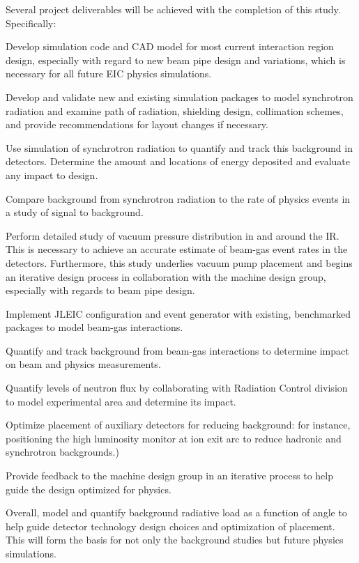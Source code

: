 Several project deliverables will be achieved with the completion of this study.  Specifically:
\begin{itemize}[label=\textbullet]
	
		\litem{} Develop simulation code and CAD model for most current interaction region design, especially with regard to new beam pipe design and variations, which is necessary for all future EIC physics simulations. 
	
		\litem{}Develop and validate new and existing simulation packages to model synchrotron radiation and examine path of radiation, shielding design, collimation schemes, and provide recommendations for layout changes if necessary.
		
		\litem{} Use simulation of synchrotron radiation to quantify and track this background in detectors.  Determine the amount and locations of energy deposited and evaluate any impact to  design.
		
		\litem{} Compare background from synchrotron radiation to the rate of physics events in a study of signal to background. 
		
		\litem{} Perform detailed study of vacuum pressure distribution in and around the IR.  This is necessary to achieve an accurate estimate of beam-gas event rates in the detectors.  Furthermore, this study underlies vacuum pump placement and begins an iterative design process in collaboration with the machine design group, especially with regards to beam pipe design.
		
		\litem{} Implement JLEIC configuration and event generator with existing, benchmarked packages to model beam-gas interactions.
		
		\litem{} Quantify and track background from beam-gas interactions to determine impact on beam and physics measurements.
		
		\litem{} Quantify levels of neutron flux by collaborating with Radiation Control division to model experimental area and determine its impact. 
		
		\litem{} Optimize placement of auxiliary detectors for reducing background: for instance, positioning the high luminosity monitor at ion exit arc to reduce hadronic and synchrotron backgrounds.)
					
		\litem{} Provide feedback to the machine design group in an iterative process to help guide the design optimized for physics.
		
		\litem{} Overall, model and quantify background radiative load as a function of angle to help guide detector technology design choices and optimization of placement.  This will form the basis for not only the background studies but future physics simulations.  
	
	\end{itemize}